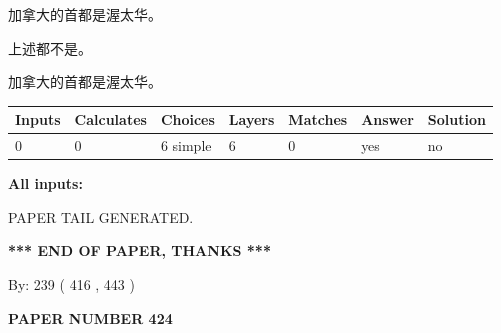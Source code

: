 \documentclass{ctexart}
\begin{document}
 
加拿大的首都是渥太华。
 
 
 上述都不是。
 
 
\noindent{}
 
 
加拿大的首都是渥太华。
 
 
\noindent{}
 
 
   
   
   
   
\noindent\begin{tabular}{|l|l|l|l|l|l|l|}
 \hline
Inputs & Calculates & Choices & Layers & Matches & Answer & Solution \\ \hline
 0  & 
 0  & 
 6
  simple  
  & 
 6  & 
 0  & 
  yes & 
  no 
  \\ \hline
 \end{tabular}
   
   
   
   
\noindent{}
   
   
   
   
\noindent\vspace{0.1in}\hspace{-0.08in} {\textbf{\Large{All inputs: }}}
   
   
   
   
   
   
 \vspace{0.2in}
 
   
   
\vspace{2.0in} PAPER TAIL GENERATED.
   
   
   
   
\vspace{1.0in} 
{\textbf{\large{ *** END OF PAPER, THANKS *** }}} 
   
   
\hspace{1.0in} By: 
 239 ( 416 ,  443 )
   
   
   
   
\newpage 
\setcounter{page}{ 
   424001 } 
   
   
   
   
 {\textbf{ \Large{ PAPER NUMBER  424  }}}
   
\end{document}
